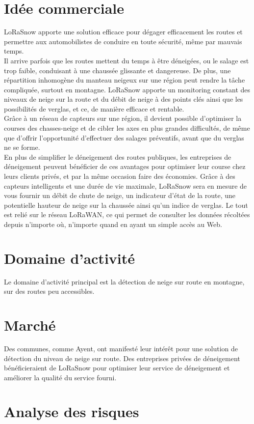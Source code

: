 \section{Idée commerciale}
LoRaSnow apporte une solution efficace pour dégager efficacement les routes et permettre
aux automobilistes de conduire en toute sécurité, même par mauvais temps.\\
Il arrive parfois que les routes mettent du temps à être déneigées,
ou le salage est trop faible, conduisant à une chaussée glissante et dangereuse.
De plus, une répartition inhomogène du manteau neigeux sur une région peut rendre
la tâche compliquée, surtout en montagne. LoRaSnow apporte un monitoring constant
des niveaux de neige sur la route et du débit de neige à des points clés ainsi que
les possibilités de verglas, et ce, de manière efficace et rentable.\\[0.2cm]
Grâce à un réseau de capteurs sur une région,
il devient possible d'optimiser la courses des chasses-neige et de cibler les axes
en plus grandes difficultés, de même que d'offrir l'opportunité d'effectuer
des salages préventifs, avant que du verglas ne se forme.\\[0.2cm]
En plus de simplifier le déneigement des routes publiques, les entreprises de déneigement
peuvent bénéficier de ces avantages pour optimiser leur course chez leurs clients privés,
et par la même occasion faire des économies. Grâce à des capteurs intelligents
et une durée de vie maximale, LoRaSnow sera en mesure de vous fournir un débit
de chute de neige, un indicateur d'état de la route, une potentielle hauteur de
neige sur la chaussée ainsi qu'un indice de verglas. Le tout est relié sur le réseau
LoRaWAN, ce qui permet de consulter les données récoltées depuis n'importe où,
n'importe quand en ayant un simple accès au Web.

\section{Domaine d'activité}
Le domaine d'activité principal est la détection de neige sur route en montagne,
sur des routes peu accessibles.

\section{Marché}
Des communes, comme Ayent, ont manifesté leur intérêt pour une solution
de détection du niveau de neige sur route.
Des entreprises privées de déneigement bénéficieraient de LoRaSnow pour
optimiser leur service de déneigement et améliorer la qualité du service
fourni.\newpage

\section{Analyse des risques}
